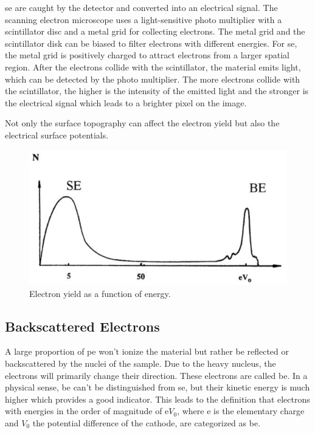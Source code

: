 \ac{se} are caught by the detector and converted into
an electrical signal.
The scanning electron microscope uses a light-sensitive photo multiplier
with a scintillator disc and a metal grid for collecting electrons.
The metal grid and the scintillator disk can be biased to filter
electrons with different energies.
For \ac{se}, the metal grid is positively charged to attract electrons
from a larger spatial region.
After the electrons collide with the scintillator, the material emits
light, which can be detected by the photo multiplier.
The more electrons collide with the scintillator, the higher is the
intensity of the emitted light and the stronger is the
electrical signal which leads to a brighter pixel on the image.

Not only the surface topography can affect the electron yield but also
the electrical surface potentials.
\begin{figure}[H]
	\centering
	\includegraphics[width=0.95\linewidth]{../assets/elektronen.png}
	\caption{Electron yield as a function of energy. }
	\label{fig:electrons}
\end{figure}

\subsection{Backscattered Electrons}
A large proportion of \ac{pe} won't ionize the material but
rather be reflected or backscattered by the nuclei of the sample.
Due to the heavy nucleus, the electrons will primarily change their
direction.
These electrons are called \ac{be}. In a physical sense, \ac{be} can't be
distinguished from \ac{se}, but their kinetic energy is much higher
which provides a good indicator.
This leads to the definition that electrons with energies in the order
of magnitude of $\mathrm{e} V_0$, where $\mathrm{e}$ is the elementary
charge and $V_0$ the potential difference of the cathode, are
categorized as \ac{be}.

